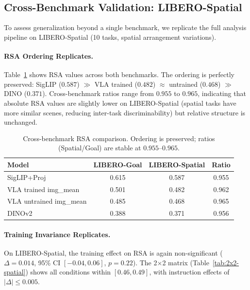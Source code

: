 \documentclass[letterpaper]{article}
\begin{document}
\subsection{Cross-Benchmark Validation: LIBERO-Spatial}
\label{sec:exp-spatial}

To assess generalization beyond a single benchmark, we replicate the full analysis pipeline on LIBERO-Spatial (10 tasks, spatial arrangement variations).

\paragraph{RSA Ordering Replicates.}
Table~\ref{tab:cross-benchmark-rsa} shows RSA values across both benchmarks.
The ordering is perfectly preserved: SigLIP ($0.587$) $\gg$ VLA trained ($0.482$) $\approx$ untrained ($0.468$) $\gg$ DINO ($0.371$).
Cross-benchmark ratios range from $0.955$ to $0.965$, indicating that absolute RSA values are slightly lower on LIBERO-Spatial (spatial tasks have more similar scenes, reducing inter-task discriminability) but relative structure is unchanged.

\begin{table}[t]
\centering
\caption{Cross-benchmark RSA comparison. Ordering is preserved; ratios (Spatial/Goal) are stable at $0.955$--$0.965$.}
\label{tab:cross-benchmark-rsa}
\begin{tabular}{@{}lccc@{}}
\toprule
Model & LIBERO-Goal & LIBERO-Spatial & Ratio \\
\midrule
SigLIP+Proj         & 0.615 & 0.587 & 0.955 \\
VLA trained img\_mean  & 0.501 & 0.482 & 0.962 \\
VLA untrained img\_mean & 0.485 & 0.468 & 0.965 \\
DINOv2               & 0.388 & 0.371 & 0.956 \\
\bottomrule
\end{tabular}
\end{table}

\paragraph{Training Invariance Replicates.}
On LIBERO-Spatial, the training effect on RSA is again non-significant ($\Delta{=}0.014$, 95\% CI $[-0.04, 0.06]$, $p{=}0.22$).
The 2$\times$2 matrix (Table~\ref{tab:2x2-spatial}) shows all conditions within $[0.46, 0.49]$, with instruction effects of $|\Delta|{\leq}0.005$.
\end{document}
